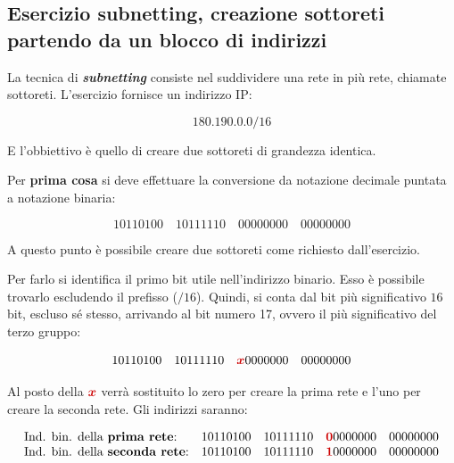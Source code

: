 \documentclass[a4paper]{article}
\newcommand{\binaryaddress}[4]{#1 \hspace{1em} #2 \hspace{1em} #3 \hspace{1em} #4}
\begin{document}
	\subsection{\textcolor{Red3}{Esercizio subnetting, creazione sottoreti partendo da un blocco di indirizzi}}
	
	La tecnica di \textcolor{Red3}{\textbf{\emph{subnetting}}} consiste nel suddividere una rete in più rete, chiamate sottoreti. L'esercizio fornisce un indirizzo IP:
	
	\begin{equation*}
		180.190.0.0/16
	\end{equation*}

	\noindent
	E l'obbiettivo è quello di creare due sottoreti di grandezza identica.\newline
	
	\noindent
	Per \textbf{prima cosa} si deve effettuare la conversione da notazione decimale puntata a notazione binaria:
	
	\begin{equation*}
		\binaryaddress{10110100}{10111110}{00000000}{00000000}
	\end{equation*}

	\noindent
	A questo punto è possibile creare due sottoreti come richiesto dall’esercizio.\newline
	
	\noindent
	Per farlo si identifica il primo bit utile nell'indirizzo binario. Esso è possibile trovarlo escludendo il prefisso ($/16$). Quindi, si conta dal bit più significativo $16$ bit, escluso sé stesso, arrivando al bit numero 17, ovvero il più significativo del terzo gruppo:
	
	\begin{equation*}
		\binaryaddress{10110100}{10111110}{\textcolor{Red3}{\boldsymbol{x}}0000000}{00000000}
	\end{equation*}

	\noindent
	Al posto della $\textcolor{Red3}{\boldsymbol{x}}$ verrà sostituito lo zero per creare la prima rete e l’uno per creare la seconda rete. Gli indirizzi saranno:
	
	\begin{equation*}
		\begin{array}{ll}
			\text{Ind. bin. della \textbf{prima rete}:} 	& \binaryaddress{10110100}{10111110}{\textcolor{Red3}{\boldsymbol{0}}0000000}{00000000} \\
			\text{Ind. bin. della \textbf{seconda rete}:} 	& \binaryaddress{10110100}{10111110}{\textcolor{Red3}{\boldsymbol{1}}0000000}{00000000}
		\end{array}
	\end{equation*}
\end{document}
